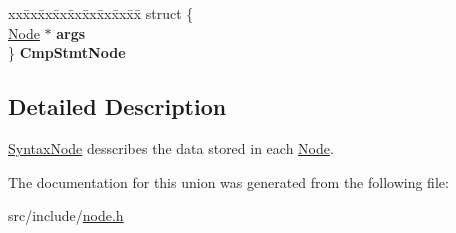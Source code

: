 \begin{DoxyCompactItemize}
\begin{tabbing}
\end{tabbing}\item 
\mbox{\label{union_syntax_node_a57ac91017fd67029cde318d0d26225f0}} 
\begin{tabbing}
xx\=xx\=xx\=xx\=xx\=xx\=xx\=xx\=xx\=\kill
struct \{\\
\>\mbox{\hyperlink{struct_node}{Node}} $\ast$ {\bfseries args}\\
\} {\bfseries CmpStmtNode}\\

\end{tabbing}\end{DoxyCompactItemize}


\subsection{Detailed Description}
\mbox{\hyperlink{union_syntax_node}{Syntax\+Node}} desscribes the data stored in each \mbox{\hyperlink{struct_node}{Node}}. 

The documentation for this union was generated from the following file\+:\begin{DoxyCompactItemize}
\item 
src/include/\mbox{\hyperlink{node_8h}{node.\+h}}\end{DoxyCompactItemize}
